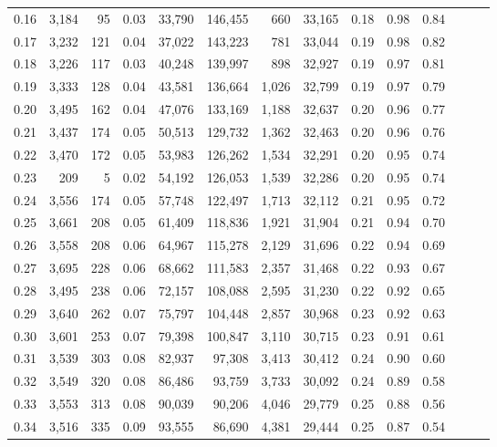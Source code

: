 \begin{tabular}{rrrrrrrrrrrrrr}
0.16 &  3,184 &   95 &  0.03 &   33,790 &  146,455 &     660 &  33,165 &  0.18 &  0.98 &      0.84 \\
0.17 &  3,232 &  121 &  0.04 &   37,022 &  143,223 &     781 &  33,044 &  0.19 &  0.98 &      0.82 \\
0.18 &  3,226 &  117 &  0.03 &   40,248 &  139,997 &     898 &  32,927 &  0.19 &  0.97 &      0.81 \\
0.19 &  3,333 &  128 &  0.04 &   43,581 &  136,664 &   1,026 &  32,799 &  0.19 &  0.97 &      0.79 \\
0.20 &  3,495 &  162 &  0.04 &   47,076 &  133,169 &   1,188 &  32,637 &  0.20 &  0.96 &      0.77 \\
0.21 &  3,437 &  174 &  0.05 &   50,513 &  129,732 &   1,362 &  32,463 &  0.20 &  0.96 &      0.76 \\
0.22 &  3,470 &  172 &  0.05 &   53,983 &  126,262 &   1,534 &  32,291 &  0.20 &  0.95 &      0.74 \\
0.23 &    209 &    5 &  0.02 &   54,192 &  126,053 &   1,539 &  32,286 &  0.20 &  0.95 &      0.74 \\
0.24 &  3,556 &  174 &  0.05 &   57,748 &  122,497 &   1,713 &  32,112 &  0.21 &  0.95 &      0.72 \\
0.25 &  3,661 &  208 &  0.05 &   61,409 &  118,836 &   1,921 &  31,904 &  0.21 &  0.94 &      0.70 \\
0.26 &  3,558 &  208 &  0.06 &   64,967 &  115,278 &   2,129 &  31,696 &  0.22 &  0.94 &      0.69 \\
0.27 &  3,695 &  228 &  0.06 &   68,662 &  111,583 &   2,357 &  31,468 &  0.22 &  0.93 &      0.67 \\
0.28 &  3,495 &  238 &  0.06 &   72,157 &  108,088 &   2,595 &  31,230 &  0.22 &  0.92 &      0.65 \\
0.29 &  3,640 &  262 &  0.07 &   75,797 &  104,448 &   2,857 &  30,968 &  0.23 &  0.92 &      0.63 \\
0.30 &  3,601 &  253 &  0.07 &   79,398 &  100,847 &   3,110 &  30,715 &  0.23 &  0.91 &      0.61 \\
0.31 &  3,539 &  303 &  0.08 &   82,937 &   97,308 &   3,413 &  30,412 &  0.24 &  0.90 &      0.60 \\
0.32 &  3,549 &  320 &  0.08 &   86,486 &   93,759 &   3,733 &  30,092 &  0.24 &  0.89 &      0.58 \\
0.33 &  3,553 &  313 &  0.08 &   90,039 &   90,206 &   4,046 &  29,779 &  0.25 &  0.88 &      0.56 \\
0.34 &  3,516 &  335 &  0.09 &   93,555 &   86,690 &   4,381 &  29,444 &  0.25 &  0.87 &      0.54 \\

\end{tabular}
